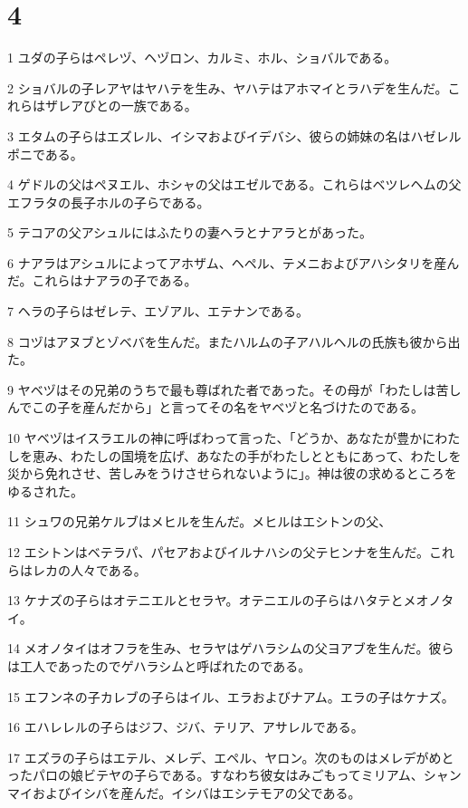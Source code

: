 \chapter{4}

\par 1 ユダの子らはペレヅ、ヘヅロン、カルミ、ホル、ショバルである。
\par 2 ショバルの子レアヤはヤハテを生み、ヤハテはアホマイとラハデを生んだ。これらはザレアびとの一族である。
\par 3 エタムの子らはエズレル、イシマおよびイデバシ、彼らの姉妹の名はハゼレルポニである。
\par 4 ゲドルの父はペヌエル、ホシャの父はエゼルである。これらはベツレヘムの父エフラタの長子ホルの子らである。
\par 5 テコアの父アシュルにはふたりの妻ヘラとナアラとがあった。
\par 6 ナアラはアシュルによってアホザム、ヘペル、テメニおよびアハシタリを産んだ。これらはナアラの子である。
\par 7 ヘラの子らはゼレテ、エゾアル、エテナンである。
\par 8 コヅはアヌブとゾベバを生んだ。またハルムの子アハルヘルの氏族も彼から出た。
\par 9 ヤベヅはその兄弟のうちで最も尊ばれた者であった。その母が「わたしは苦しんでこの子を産んだから」と言ってその名をヤベヅと名づけたのである。
\par 10 ヤベヅはイスラエルの神に呼ばわって言った、「どうか、あなたが豊かにわたしを恵み、わたしの国境を広げ、あなたの手がわたしとともにあって、わたしを災から免れさせ、苦しみをうけさせられないように」。神は彼の求めるところをゆるされた。
\par 11 シュワの兄弟ケルブはメヒルを生んだ。メヒルはエシトンの父、
\par 12 エシトンはベテラパ、パセアおよびイルナハシの父テヒンナを生んだ。これらはレカの人々である。
\par 13 ケナズの子らはオテニエルとセラヤ。オテニエルの子らはハタテとメオノタイ。
\par 14 メオノタイはオフラを生み、セラヤはゲハラシムの父ヨアブを生んだ。彼らは工人であったのでゲハラシムと呼ばれたのである。
\par 15 エフンネの子カレブの子らはイル、エラおよびナアム。エラの子はケナズ。
\par 16 エハレレルの子らはジフ、ジバ、テリア、アサレルである。
\par 17 エズラの子らはエテル、メレデ、エペル、ヤロン。次のものはメレデがめとったパロの娘ビテヤの子らである。すなわち彼女はみごもってミリアム、シャンマイおよびイシバを産んだ。イシバはエシテモアの父である。
